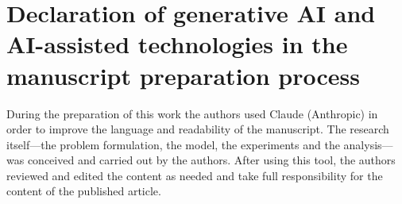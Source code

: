 \section*{Declaration of generative AI and AI-assisted technologies in the
manuscript preparation process}
During the preparation of this work the authors used Claude (Anthropic) in
order to improve the language and readability of the manuscript.  The
research itself---the problem formulation, the model, the experiments and
the analysis---was conceived and carried out by the authors.  After using
this tool, the authors reviewed and edited the content as needed and take
full responsibility for the content of the published article.
